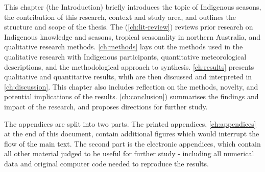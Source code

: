 This chapter (the Introduction) briefly introduces the topic of
Indigenous seasons, the contribution of this research, context and
study area, and outlines the structure and scope of the thesis.
The  (\cref{ch:lit-review}) reviews prior research
on Indigenous knowledge and seasons, tropical seasonality in northern
Australia, and qualitative research methods.
%
\cref{ch:methods} lays out the methods used in the qualitative research
with Indigenous participants, quantitative meteorological descriptions,
and the methodological approach to synthesis.  \cref{ch:results} presents
qualitative and quantitative results, whih are then discussed and interpreted
in \cref{ch:discussion}.  This chapter also includes reflection on the
methods, novelty, and potential implications of the results.
\cref{ch:conclusion}) summarises the findings and impact of the research,
and proposes directions for further study.

The appendices are split into two parts.  The printed appendices,
\cref{ch:appendices} at the end of this document, contain additional figures
which would interrupt the flow of the main text.  The second part
is the electronic appendices, which contain all other material judged to
be useful for further study - including all numerical data and original computer code
needed to reproduce the results.

